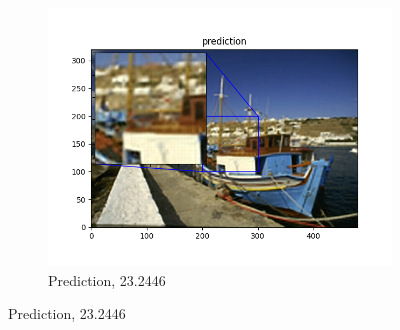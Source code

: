 \documentclass[12pt]{article}
\begin{document}
\begin{figure}[h!]
\begin{subfigure}[b]{0.32\linewidth}
    \includegraphics[width=\linewidth]{./5-prediction.png}
    \caption{Prediction, 23.2446}
  \end{subfigure}


\end{figure}
\end{document}
